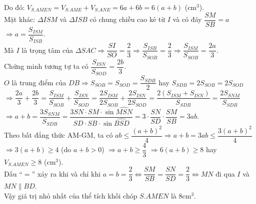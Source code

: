 \begin{ex}
{		Do đó: $V_{S.AMEN}=V_{S.AME}+V_{S.ANE}=6a+6b=6\left(a+b\right)$ ($\mathrm{cm}^3$).\\
		Mặt khác: $\Delta ISM$ và $\Delta ISB$ có chung chiều cao kẻ từ $ I$ và có đáy $\dfrac{SM}{SB}=a$$\Rightarrow a=\dfrac{S_{ISM}}{S_{ISB}}$.\\
		Mà $ I$ là trọng tâm của $\Delta SAC$$\Rightarrow\dfrac{SI}{SO}=\dfrac{2}{3}$$\Rightarrow\dfrac{S_{ISB}}{S_{SOB}}=\dfrac{2}{3}$$\Rightarrow\dfrac{S_{ISM}}{S_{SOB}}=\dfrac{2a}{3}$.\\
		Chứng minh tương tự ta có $\dfrac{S_{ISN}}{S_{SOD}}=\dfrac{2b}{3}$.\\
		$ O$ là trung điểm của $DB$$\Rightarrow{S_{SOB}}=S_{SOD}=\dfrac{S_{SDB}}{2}$ hay $S_{SDB}=2S_{SOB}=2S_{SOD}$\\
		$\Rightarrow\dfrac{2a}{3}+\dfrac{2b}{3}=\dfrac{S_{ISM}}{S_{SOB}}+\dfrac{S_{ISN}}{S_{SOD}}=\dfrac{2S_{ISM}}{2S_{SOB}}+\dfrac{2S_{ISN}}{2S_{SOD}}=\dfrac{2\left(S_{ISM}+S_{ISN}\right)}{S_{SDB}}=\dfrac{2S_{SNM}}{S_{SDB}}$\\
		$\Rightarrow a+b=\dfrac{3S_{SNM}}{S_{SDB}}=\dfrac{3SN\cdot SM\cdot\sin\widehat{MSN}}{SD\cdot SB\cdot\sin\widehat{BSD}}=3\cdot\dfrac{SN}{SD}\cdot\dfrac{SM}{SB}=3ab$.\\
		Theo bất đẳng thức AM-GM, ta có $ab\le\dfrac{\left(a+b\right)^2}{4}$$\Rightarrow a+b=3ab\le\dfrac{3\left(a+b\right)^2}{4}$\\
		$\Rightarrow 3\left(a+b\right)\ge 4$ (do $ a+b>0$) $\Rightarrow a+b\ge\dfrac{4}{3}$ $\Rightarrow 6\left(a+b\right)\ge 8$ hay $V_{S.AMEN}\ge 8$ ($\mathrm{cm}^3$).\\
		Dấu ``$=$'' xảy ra khi và chỉ khi $ a=b=\dfrac{2}{3}\Leftrightarrow\dfrac{SM}{SB}=\dfrac{SN}{SD}=\dfrac{2}{3}\Leftrightarrow MN$ đi qua $ I$ và $ MN\parallel BD$.\\
		Vậy giá trị nhỏ nhất của thể tích khối chóp $ S.AMEN$ là $8$$\mathrm{cm}^3$.
	}
\end{ex}

